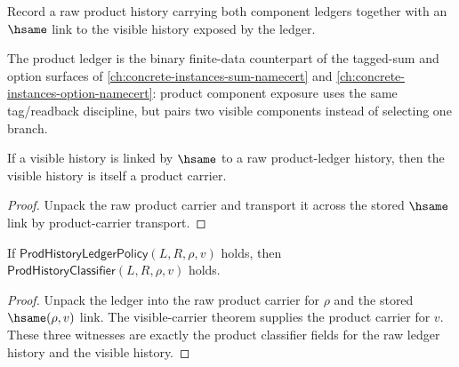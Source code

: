 \begin{definition}
\label{def:prod-ledger-policy}
Record a raw product history carrying both component ledgers together with an
$\hsame$ link to the visible history exposed by the ledger.
\end{definition}

The product ledger is the binary finite-data counterpart of the tagged-sum and option surfaces of \autoref{ch:concrete-instances-sum-namecert} and \autoref{ch:concrete-instances-option-namecert}: product component exposure uses the same tag/readback discipline, but pairs two visible components instead of selecting one branch.

\begin{theorem}
\label{thm:prod-ledger-visible-carrier}
If a visible history is linked by $\hsame$ to a raw product-ledger history,
then the visible history is itself a product carrier.
\end{theorem}
\begin{proof}
Unpack the raw product carrier and transport it across the stored $\hsame$
link by product-carrier transport.
\end{proof}

\begin{theorem}
\label{thm:prod-ledger-raw-visible-classifier}
If $\mathsf{ProdHistoryLedgerPolicy}(L,R,\rho,v)$ holds, then
$\mathsf{ProdHistoryClassifier}(L,R,\rho,v)$ holds.
\end{theorem}
\begin{proof}
Unpack the ledger into the raw product carrier for $\rho$ and the stored
$\hsame(\rho,v)$ link. The visible-carrier theorem supplies the product
carrier for $v$. These three witnesses are exactly the product classifier
fields for the raw ledger history and the visible history.
\end{proof}

